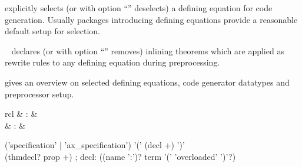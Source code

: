 \begin{isabellebody}
\begin{isamarkuptext}
\begin{description}
  \item \hyperlink{attribute.HOL.code}{\mbox{}} explicitly selects (or with option
  ``'' deselects) a defining equation for code
  generation.  Usually packages introducing defining equations provide
  a reasonable default setup for selection.

  \item \hyperlink{attribute.HOL.code}{\mbox{}}~ declares (or with
  option ``'' removes) inlining theorems which are
  applied as rewrite rules to any defining equation during
  preprocessing.

  \item \hyperlink{command.HOL.print-codesetup}{\mbox{}} gives an overview on
  selected defining equations, code generator datatypes and
  preprocessor setup.

  \end{description}%
\end{isamarkuptext}%
\isamarkuptrue%
%
\isamarkuptrue%
%
\begin{isamarkuptext}%
\begin{matharray}{rcl}
    \hypertarget{command.HOL.specification}{\hyperlink{command.HOL.specification}{\mbox{}}} & : &  \\
    \hypertarget{command.HOL.ax-specification}{\hyperlink{command.HOL.ax-specification}{\mbox{}}} & : &  \\
  \end{matharray}

  \begin{rail}
  ('specification' | 'ax\_specification') '(' (decl +) ')' \\ (thmdecl? prop +)
  ;
  decl: ((name ':')? term '(' 'overloaded' ')'?)
  \end{rail}

  \begin{description}


\end{description}
\end{isamarkuptext}
\end{isabellebody}

